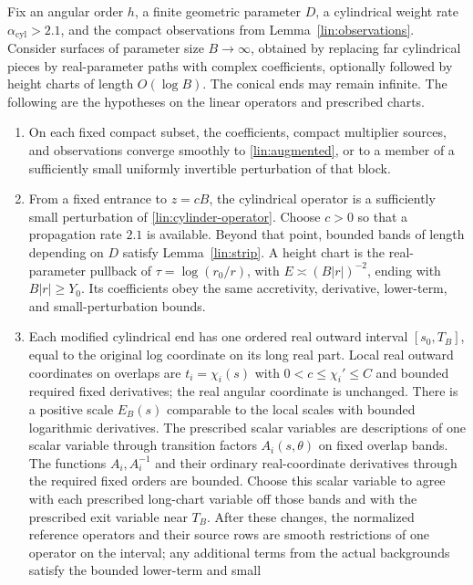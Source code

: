 \begin{proposition}\label{lin:global}
Fix an angular order $h$, a finite geometric parameter $D$, a cylindrical
weight rate $\alpha_{\mathrm{cyl}}>2.1$, and the
compact observations from Lemma~\ref{lin:observations}.  Consider surfaces of
parameter size $B\to\infty$, obtained by replacing far cylindrical
pieces by real-parameter paths with complex coefficients, optionally
followed by height charts of length $O(\log B)$.  The conical ends may
remain infinite.  The following are the hypotheses on the linear
operators and prescribed charts.

\begin{enumerate}
 \item On each fixed compact subset, the coefficients, compact
 multiplier sources, and observations converge smoothly to
 \eqref{lin:augmented}, or to a member of a sufficiently small uniformly
 invertible perturbation of that block.
 \item From a fixed entrance to $z=cB$, the cylindrical operator is a
 sufficiently small perturbation of
 \eqref{lin:cylinder-operator}.  Choose $c>0$ so that a propagation
 rate $2.1$ is available.  Beyond that point, bounded bands of length
 depending on $D$ satisfy Lemma~\ref{lin:strip}.  A height chart is the
 real-parameter pullback of $\tau=\log(r_0/r)$, with
 $E\asymp(B|r|)^{-2}$, ending with
 $B|r|\ge Y_0$.  Its coefficients obey the same accretivity, derivative,
 lower-term, and small-perturbation bounds.
 \item Each modified cylindrical end has one ordered real outward
 interval $[s_0,T_B]$, equal to the original log coordinate on its
 long real part.  Local real outward coordinates on overlaps are
 $t_i=\chi_i(s)$ with $0<c\le\chi_i'\le C$ and bounded required
 fixed derivatives; the real angular coordinate is unchanged.
 There is a positive scale $E_B(s)$ comparable to the local scales
 with bounded logarithmic derivatives.  The prescribed scalar
 variables are descriptions of one scalar variable through transition
 factors $A_i(s,\theta)$ on fixed overlap bands.  The functions
 $A_i,A_i^{-1}$ and their ordinary real-coordinate derivatives through
 the required fixed orders are bounded.  Choose this scalar variable
 to agree with each prescribed long-chart variable off those bands and
 with the prescribed exit variable near $T_B$.  After these changes,
 the normalized reference operators and their source rows are smooth
 restrictions of one operator on the interval; any additional terms
 from the actual backgrounds satisfy the bounded lower-term and small

\end{enumerate}
\end{proposition}
